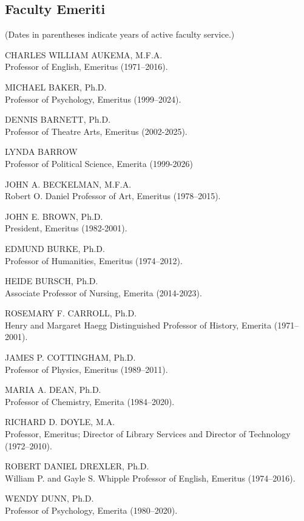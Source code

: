 \documentclass[
  letterpaper,
]{scrbook}
\begin{document}
\subsection{Faculty Emeriti}\label{faculty-emeriti}

(Dates in parentheses indicate years of active faculty service.)

CHARLES WILLIAM AUKEMA, M.F.A.\\
Professor of English, Emeritus (1971--2016).

MICHAEL BAKER, Ph.D.\\
Professor of Psychology, Emeritus (1999--2024).

DENNIS BARNETT, Ph.D.\\
Professor of Theatre Arts, Emeritus (2002-2025).

LYNDA BARROW\\
Professor of Political Science, Emerita (1999-2026)

JOHN A. BECKELMAN, M.F.A.\\
Robert O. Daniel Professor of Art, Emeritus (1978--2015).

JOHN E. BROWN, Ph.D.\\
President, Emeritus (1982-2001).

EDMUND BURKE, Ph.D.\\
Professor of Humanities, Emeritus (1974--2012).

HEIDE BURSCH, Ph.D.\\
Associate Professor of Nursing, Emerita (2014-2023).

ROSEMARY F. CARROLL, Ph.D.\\
Henry and Margaret Haegg Distinguished Professor of History, Emerita
(1971--2001).

JAMES P. COTTINGHAM, Ph.D.\\
Professor of Physics, Emeritus (1989--2011).

MARIA A. DEAN, Ph.D.\\
Professor of Chemistry, Emerita (1984--2020).

RICHARD D. DOYLE, M.A.\\
Professor, Emeritus; Director of Library Services and Director of
Technology (1972--2010).

ROBERT DANIEL DREXLER, Ph.D.\\
William P. and Gayle S. Whipple Professor of English, Emeritus
(1974--2016).

WENDY DUNN, Ph.D.\\
Professor of Psychology, Emerita (1980--2020).
\end{document}
